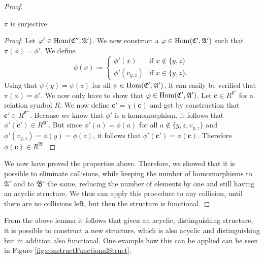 \begin{proof}
	\begin{claim}
		$\pi$ is surjective.
	\end{claim}
	\begin{proof}
		Let $\varphi'\in\operatorname{Hom}(\mathfrak C'',\mathfrak A')$.
		We now construct a $\varphi\in\operatorname{Hom}(\mathfrak C',\mathfrak A')$ such that $\pi(\phi)=\phi'$.
		We define
		$$
		\phi(x)\coloneqq
		\begin{cases}
			\phi'(x) & \text{if } x \notin \{y,z\} \\
			\phi'(v_{y,z}) & \text{if } x \in \{y,z\}.
		\end{cases}
		$$
		Using that $\psi(y)=\psi(z)$ for all $\psi\in\operatorname{Hom}(\mathfrak C',\mathfrak A')$, it can easily be verified that $\pi(\phi)=\phi'$.
		We now only have to show that $\varphi\in\operatorname{Hom}(\mathfrak C',\mathfrak A')$. 
		Let $\mathbf c\in R^{\mathfrak C'}$ for a relation symbol $R$.
		We now define $\mathbf c'= \chi(\mathbf c)$ and get by construction that $\mathbf c'\in R^{\mathfrak C''}$.
		Because we know that $\phi'$ is a homomorphism, it follows that $\phi'(\mathbf c')\in R^{\mathfrak A'}$.
		But since $\phi'(a)=\phi(a)$ for all $a\notin \{y,z,v_{y,z}\}$ and $\phi'(v_{y,z})=\phi(y)=\phi(z)$, it follows that $\phi'(\mathbf c')=\phi(\mathbf c)$.
		Therefore $\phi(\mathbf c)\in R^{\mathfrak A'}$.
	\end{proof}
	
	We now have proved the properties above.
	Therefore, we showed that it is possible to eliminate collisions, while keeping the number of homomorphisms to $\mathfrak A'$ and to $\mathfrak B'$ the same, reducing the number of elements by one and still having an acyclic structure.
	We thus can apply this procedure to any collision, until there are no collisions left, but then the structure is functional.
\end{proof}

From the above lemma it follows that given an acyclic, distinguishing structure, it is possible to construct a new structure, which is also acyclic and distinguishing but in addition also functional.
One example how this can be applied can be seen in Figure \ref{fig:constructFunctionalStruct}.

